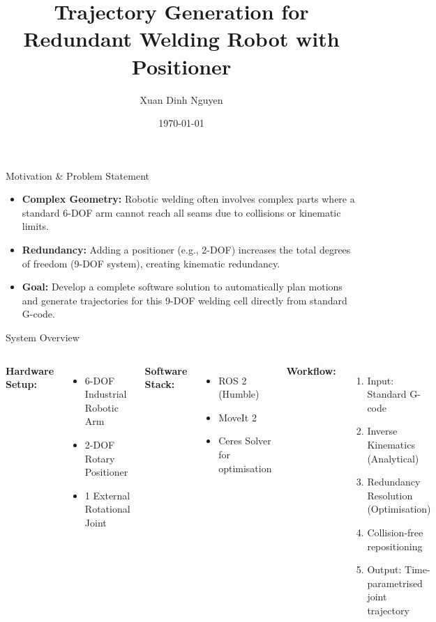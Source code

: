 \documentclass[10pt, aspectratio=169]{beamer}
\title[Trajectory Gen. for Redundant Welding Robot]{Trajectory Generation for Redundant Welding Robot with Positioner}
\author{Xuan Dinh Nguyen}
\institute[CTU in Prague]{
    Czech Technical University in Prague\\
    Faculty of Electrical Engineering\\
    Department of Cybernetics
}
\date{\today}
\begin{document}
\begin{frame}
    \titlepage
\end{frame}

\begin{frame}{Motivation \& Problem Statement}
    \begin{itemize}
        \item \textbf{Complex Geometry:} Robotic welding often involves complex parts where a standard 6-DOF arm cannot reach all seams due to collisions or kinematic limits.
        \item \textbf{Redundancy:} Adding a positioner (e.g., 2-DOF) increases the total degrees of freedom (9-DOF system), creating kinematic redundancy.
        \item \textbf{Goal:} Develop a complete software solution to automatically plan motions and generate trajectories for this 9-DOF welding cell directly from standard G-code.
    \end{itemize}
\end{frame}

\begin{frame}{System Overview}
    \begin{columns}
        \textbf{Hardware Setup:}
        \begin{itemize}
            \item 6-DOF Industrial Robotic Arm
            \item 2-DOF Rotary Positioner
            \item 1 External Rotational Joint
        \end{itemize}
        
        \vspace{0.5cm}
        \textbf{Software Stack:}
        \begin{itemize}
            \item ROS 2 (Humble)
            \item MoveIt 2
            \item Ceres Solver for optimisation
        \end{itemize}
        
        \textbf{Workflow:}
        \begin{enumerate}
            \item Input: Standard G-code
            \item Inverse Kinematics (Analytical)
            \item Redundancy Resolution (Optimisation)
            \item Collision-free repositioning
            \item Output: Time-parametrised joint trajectory
        \end{enumerate}
    \end{columns}
\end{frame}
\end{document}
